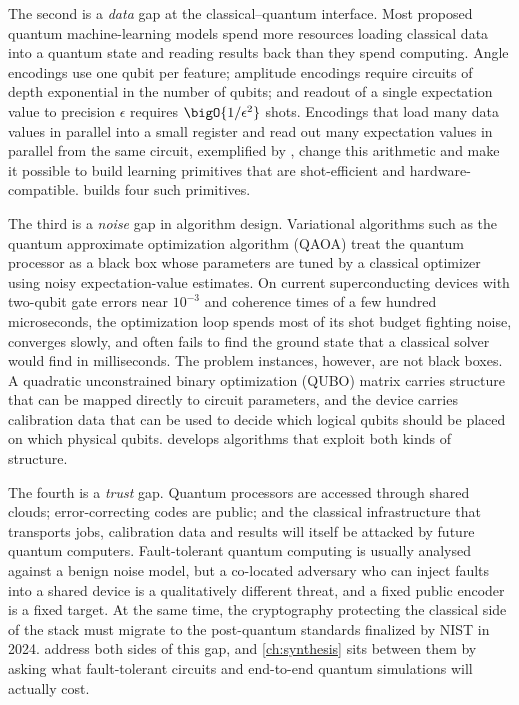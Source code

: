 The second is a \emph{data} gap at the classical--quantum interface. Most proposed quantum machine-learning models spend more resources loading classical data into a quantum state and reading results back than they spend computing. Angle encodings use one qubit per feature; amplitude encodings require circuits of depth exponential in the number of qubits; and readout of a single expectation value to precision $\epsilon$ requires $\bigO{1/\epsilon^{2}}$ shots. Encodings that load many data values in parallel into a small register and read out many expectation values in parallel from the same circuit, exemplified by \qcrank, change this arithmetic and make it possible to build learning primitives that are shot-efficient and hardware-compatible.  builds four such primitives.

The third is a \emph{noise} gap in algorithm design. Variational algorithms such as the quantum approximate optimization algorithm (QAOA) treat the quantum processor as a black box whose parameters are tuned by a classical optimizer using noisy expectation-value estimates. On current superconducting devices with two-qubit gate errors near $10^{-3}$ and coherence times of a few hundred microseconds, the optimization loop spends most of its shot budget fighting noise, converges slowly, and often fails to find the ground state that a classical solver would find in milliseconds. The problem instances, however, are not black boxes. A quadratic unconstrained binary optimization (QUBO) matrix carries structure that can be mapped directly to circuit parameters, and the device carries calibration data that can be used to decide which logical qubits should be placed on which physical qubits.  develops algorithms that exploit both kinds of structure.

The fourth is a \emph{trust} gap. Quantum processors are accessed through shared clouds; error-correcting codes are public; and the classical infrastructure that transports jobs, calibration data and results will itself be attacked by future quantum computers. Fault-tolerant quantum computing is usually analysed against a benign noise model, but a co-located adversary who can inject faults into a shared device is a qualitatively different threat, and a fixed public encoder is a fixed target. At the same time, the cryptography protecting the classical side of the stack must migrate to the post-quantum standards finalized by NIST in 2024.  address both sides of this gap, and \cref{ch:synthesis} sits between them by asking what fault-tolerant circuits and end-to-end quantum simulations will actually cost.

